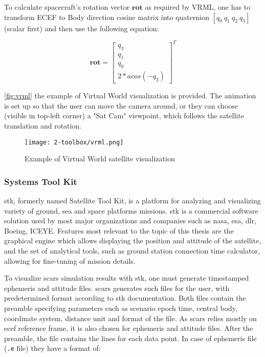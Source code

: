         To calculate spacecraft's rotation vector $\textbf{rot}$ as required by VRML, one has to transform ECEF to Body direction cosine matrix into quaternion $[q_0\: q_1\: q_2\: q_3]$ (scalar first) and then use the following equation:

        \begin{equation}
            \textbf{rot}=
            \begin{bmatrix}
                q_3\\
                q_1\\
                q_0\\
                2*acos(-q_2)
            \end{bmatrix}^T
        \end{equation}

        \autoref{fig:vrml} the example of Virtual World visualization is provided. The animation is set up so that the user can move the camera around, or they can choose (visible in top-left corner) a "Sat Cam" viewpoint, which follows the satellite translation and rotation.

        \begin{figure}[H]
            \centering
            \texttt{[image: 2-toolbox/vrml.png]}
            \caption{Example of Virtual World satellite visualization}
            \label{fig:vrml}
        \end{figure}
        

    \subsubsection{Systems Tool Kit}
        \ac{stk}, formerly named Satellite Tool Kit, is a platform for analyzing and visualizing variety of ground, sea and space platforms missions. \ac{stk} is a commercial software solution used by most major organizations and companies such as \ac{nasa}, \ac{esa}, \ac{dlr}, Boeing, ICEYE. Features most relevant to the topic of this thesis are the graphical engine which allows displaying the position and attitude of the satellite, and the set of analytical tools, such as ground station connection time calculator, allowing for fine-tuning of mission details.

        To visualize \ac{scars} simulation results with \ac{stk}, one must generate timestamped ephemeris and attitude files. \ac{scars} generates such files for the user, with predetermined format according to \ac{stk} documentation\cite{stkephemeris}. Both files contain the preamble specifying parameters such as scenario epoch time, central body, coordinate system, distance unit and format of the file. As \ac{scars} relies mostly on \ac{ecef} reference frame, it is also chosen for ephemeris and attitude files. After the preamble, the file contains the lines for each data point. In case of ephemeris file  (\verb|.e| file) they have a format of:

